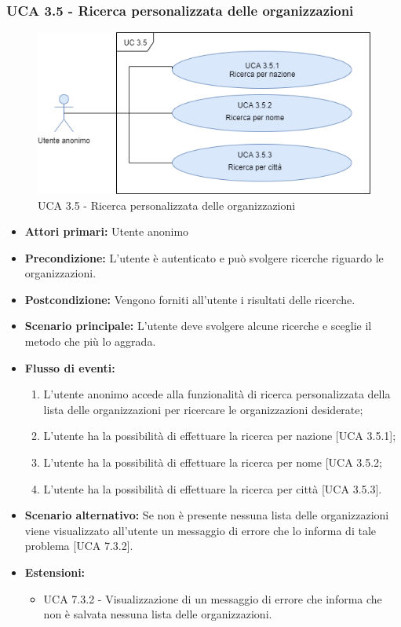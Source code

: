 \newpage

\subsubsection{UCA 3.5 - Ricerca personalizzata delle organizzazioni}%
\begin{figure}[h]
	\centering
	
	\includegraphics[scale=0.5]{sezioni/UseCase/Immagini/UCA3.5.png}
	\caption{UCA 3.5 - Ricerca personalizzata delle organizzazioni}
\end{figure}
\begin{itemize}
	\item \textbf{Attori primari:} Utente anonimo
	\item \textbf{Precondizione:} L'utente è autenticato e può svolgere ricerche riguardo le organizzazioni.
	\item \textbf{Postcondizione:} Vengono forniti all'utente i risultati delle ricerche.
	\item \textbf{Scenario principale:} L'utente deve svolgere alcune ricerche e sceglie il metodo che più lo aggrada.
	\item \textbf{Flusso di eventi:} 
	\begin{enumerate}
		\item L'utente anonimo accede alla funzionalità di ricerca personalizzata della lista delle organizzazioni per ricercare le organizzazioni desiderate;
		\item L'utente ha la possibilità di effettuare la ricerca per nazione [UCA 3.5.1];
		\item L'utente ha la possibilità di effettuare la ricerca per nome [UCA 3.5.2;
		\item L'utente ha la possibilità di effettuare la ricerca per città [UCA 3.5.3].
	\end{enumerate}
	\item \textbf{Scenario alternativo:} Se non è presente nessuna lista delle organizzazioni viene visualizzato all'utente un messaggio di errore che lo informa di tale problema [UCA 7.3.2].
	\item \textbf{Estensioni:}
	\begin{itemize}
		\item UCA 7.3.2 - Visualizzazione di un messaggio di errore che informa che non è salvata nessuna lista delle organizzazioni.
	\end{itemize}
\end{itemize}

